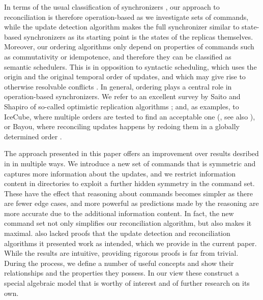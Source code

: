 In terms of the usual classification of synchronizers \cite{TSR, PV, SSH},
our approach to reconciliation is therefore operation-based as we investigate sets of commands,
while the update detection algorithm makes the full synchronizer 
similar to state-based synchronizers 
as its starting point is the states of the replicas themselves.
Moreover, our ordering algorithms only depend on properties of commands 
such as commutativity or idempotence,
and therefore they can be classified as semantic schedulers.
This is in opposition to syntactic scheduling, which uses 
the origin and the original temporal order of updates, 
and which may give rise to otherwise resolvable conflicts \cite{SSH}.
In general, ordering plays a central role in operation-based synchronizers.
We refer to an excellent survey by Saito and Shapiro of so-called optimistic replication algorithms \cite{SSH};
and, as examples,
to IceCube, where multiple orders are tested to find an acceptable one (\cite{KRSD}, see also \cite{MPV}),
or Bayou, where reconciling updates happens by redoing them in a globally determined order \cite{TTPDSH}.

The approach presented in this paper offers an improvement
over results desribed in \cite{NREC} in multiple ways.
We introduce a new set of commands that is symmetric and
captures more information about the updates,
and we restrict information content in directories
to exploit a further hidden symmetry in the command set.
These have the effect that reasoning about commands
becomes simpler as there are fewer edge cases,
and more powerful as 
predictions made by the reasoning are more accurate
due to the additional information content.
In fact, the new command set not only simplifies
our reconciliation algorithm, but also makes it maximal.
\cite{NREC} also lacked proofs that the update detection
and reconciliation algorithms it presented work as intended,
which we provide in the current paper.
While the results are intuitive, providing rigorous proofs
is far from trivial.
During the process, we define a number of useful concepts
and show their relationships and the properties they possess.
In our view these construct a special algebraic model
that is worthy of interest and of further research on its own.

